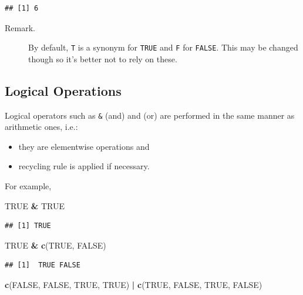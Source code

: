 \documentclass[10pt,b5paper,krantz1]{krantz}
\newenvironment{Shaded}{\begin{snugshade}}{\end{snugshade}}
\newcommand{\KeywordTok}[1]{\textcolor[rgb]{0.27,0.27,0.27}{\textbf{#1}}}
\newcommand{\NormalTok}[1]{#1}
\newcommand{\OperatorTok}[1]{\textcolor[rgb]{0.43,0.43,0.43}{\textbf{#1}}}
\newcommand{\OtherTok}[1]{\textcolor[rgb]{0.37,0.37,0.37}{#1}}
\newcommand{\StringTok}[1]{\textcolor[rgb]{0.5,0.5,0.5}{#1}}
\providecommand{\tightlist}{%
  \setlength{\itemsep}{0pt}\setlength{\parskip}{0pt}}
\begin{document}
\begin{verbatim}
## [1] 6
\end{verbatim}

\begin{description}
\item[Remark.]
By default, \texttt{T} is a synonym for \texttt{TRUE} and \texttt{F} for \texttt{FALSE}. This
may be changed though so it's better not to rely on these.
\end{description}

\hypertarget{logical-operations}{%
\subsection{Logical Operations}\label{logical-operations}}

Logical operators such as \texttt{\&} (and) and \texttt{\textbar{}} (or)
are performed in the same manner as arithmetic ones, i.e.:

\begin{itemize}
\tightlist
\item
  they are elementwise operations and
\item
  recycling rule is applied if necessary.
\end{itemize}

For example,

\begin{Shaded}
\begin{Highlighting}[]
\OtherTok{TRUE} \OperatorTok{&}\StringTok{ }\OtherTok{TRUE}
\end{Highlighting}
\end{Shaded}

\begin{verbatim}
## [1] TRUE
\end{verbatim}

\begin{Shaded}
\begin{Highlighting}[]
\OtherTok{TRUE} \OperatorTok{&}\StringTok{ }\KeywordTok{c}\NormalTok{(}\OtherTok{TRUE}\NormalTok{, }\OtherTok{FALSE}\NormalTok{)}
\end{Highlighting}
\end{Shaded}

\begin{verbatim}
## [1]  TRUE FALSE
\end{verbatim}

\begin{Shaded}
\begin{Highlighting}[]
\KeywordTok{c}\NormalTok{(}\OtherTok{FALSE}\NormalTok{, }\OtherTok{FALSE}\NormalTok{, }\OtherTok{TRUE}\NormalTok{, }\OtherTok{TRUE}\NormalTok{) }\OperatorTok{|}\StringTok{ }\KeywordTok{c}\NormalTok{(}\OtherTok{TRUE}\NormalTok{, }\OtherTok{FALSE}\NormalTok{, }\OtherTok{TRUE}\NormalTok{, }\OtherTok{FALSE}\NormalTok{)}
\end{Highlighting}
\end{Shaded}
\end{document}
